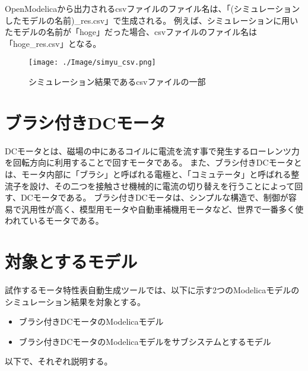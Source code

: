 OpenModelicaから出力されるcsvファイルのファイル名は、「(シミュレーションしたモデルの名前)\_res.csv」で生成される。
例えば、シミュレーションに用いたモデルの名前が「hoge」だった場合、csvファイルのファイル名は「hoge\_res.csv」となる。
\begin{figure}[t]
	\centering
	\texttt{[image: ./Image/simyu\_csv.png]}
	\caption{シミュレーション結果であるcsvファイルの一部}
	\label{fig:simyu_csv}
\end{figure}
\section{ブラシ付きDCモータ}\label{bDCmotor}
DCモータとは、磁場の中にあるコイルに電流を流す事で発生するローレンツ力を回転方向に利用することで回すモータである\cite{モータ原理}。
また、ブラシ付きDCモータとは、モータ内部に「ブラシ」と呼ばれる電極と、「コミュテータ」と呼ばれる整流子を設け、その二つを接触させ機械的に電流の切り替えを行うことによって回す、DCモータである。
ブラシ付きDCモータは、シンプルな構造で、制御が容易で汎用性が高く、模型用モータや自動車補機用モータなど、世界で一番多く使われているモータである\cite{モータ使う}。
\section{対象とするモデル}\label{taioumodel}
試作するモータ特性表自動生成ツールでは、以下に示す2つのModelicaモデルのシミュレーション結果を対象とする。
\begin{itemize}
	\item ブラシ付きDCモータのModelicaモデル
	\item ブラシ付きDCモータのModelicaモデルをサブシステムとするモデル
\end{itemize}

以下で、それぞれ説明する。
